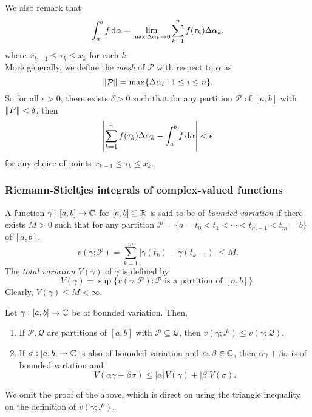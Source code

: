 		We also remark that
		\[ \int_a^b f \dif \alpha = \lim_{\max \Delta \alpha_k \to 0} \sum_{k=1}^n f(\tau_k) \Delta \alpha_k, \]
		where $x_{k-1} \le \tau_k \le x_k$ for each $k$.\\
		More generally, we define the \emph{mesh} of $\mathcal{P}$ with respect to $\alpha$ as
		\[ \left\lVert\mathcal{P}\right\rVert = \max\{ \Delta\alpha_i : 1 \le i \le n \}. \]
		So for all $\epsilon > 0$, there exists $\delta > 0$ such that for any partition $\mathcal{P}$ of $[a,b]$ with $\left\lVert P\right\rVert < \delta$, then
		\[ \left| \sum_{k=1}^n f(\tau_k) \Delta\alpha_k - \int_a^b f \dif \alpha \right| < \epsilon \]
		for any choice of points $x_{k-1} \le \tau_k \le x_k$.

	\subsubsection{Riemann-Stieltjes integrals of complex-valued functions}

		\begin{fdef}
			A function $\gamma : [a,b] \to \mathbb{C}$ for $[a,b] \subseteq \mathbb{R}$ is said to be of \emph{bounded variation} if there exists $M > 0$ such that for any partition $\mathcal{P} = \{ a = t_0 < t_1 < \cdots < t_{m-1} < t_m = b \}$ of $[a,b]$,
			\[ v(\gamma;\mathcal{P}) = \sum_{k=1}^m |\gamma(t_k) - \gamma(t_{k-1})| \le M. \]
			The \emph{total variation} $V(\gamma)$ of $\gamma$ is defined by
			\[ V(\gamma) = \sup \{ v(\gamma;\mathcal{P}) : \mathcal{P}\text{ is a partition of }[a,b] \}. \]
			Clearly, $V(\gamma) \le M < \infty$.
		\end{fdef}

		\begin{lemma}
			Let $\gamma : [a,b] \to \mathbb{C}$ be of bounded variation. Then,
			\begin{enumerate}
				\item If $\mathcal{P},\mathcal{Q}$ are partitions of $[a,b]$ with $\mathcal{P} \subseteq \mathcal{Q}$, then $v(\gamma;\mathcal{P}) \le v(\gamma;\mathcal{Q})$.
				\item If $\sigma : [a,b] \to \mathbb{C}$ is also of bounded variation and $\alpha,\beta\in\mathbb{C}$, then $\alpha\gamma + \beta\sigma$ is of bounded variation and
				\[ V(\alpha\gamma + \beta\sigma) \le |\alpha| V(\gamma) + |\beta| V(\sigma). \]
			\end{enumerate}
		\end{lemma}
		We omit the proof of the above, which is direct on using the triangle inequality on the definition of $v(\gamma;\mathcal{P})$.


